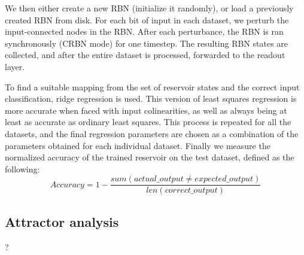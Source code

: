 We then either create a new RBN (initialize it randomly),
or load a previously created RBN from disk.
For each bit of input in each dataset,
we perturb the input-connected nodes in the RBN.
After each perturbance, the RBN is ran synchronously (CRBN mode) for one timestep.
The resulting RBN states are collected,
and after the entire dataset is processed,
forwarded to the readout layer.

To find a suitable mapping from the set of reservoir states and the correct input classification,
ridge regression \cite{hoerl1970ridge} is used.
This version of least squares regression is more accurate when faced with input colinearities, as well as always being at least as accurate as ordinary least squares.  
This process is repeated for all the datasets,
and the final regression parameters are chosen as a combination of the parameters obtained for each individual dataset.
Finally we measure the normalized accuracy of the trained reservoir on the test dataset,
defined as the following:
\begin{equation}
Accuracy = 1 - \dfrac{sum(actual\_output \neq expected\_output)}{len(correct\_output)}
\label{formula:accuracy}
\end{equation}

\subsection{Attractor analysis}

?
